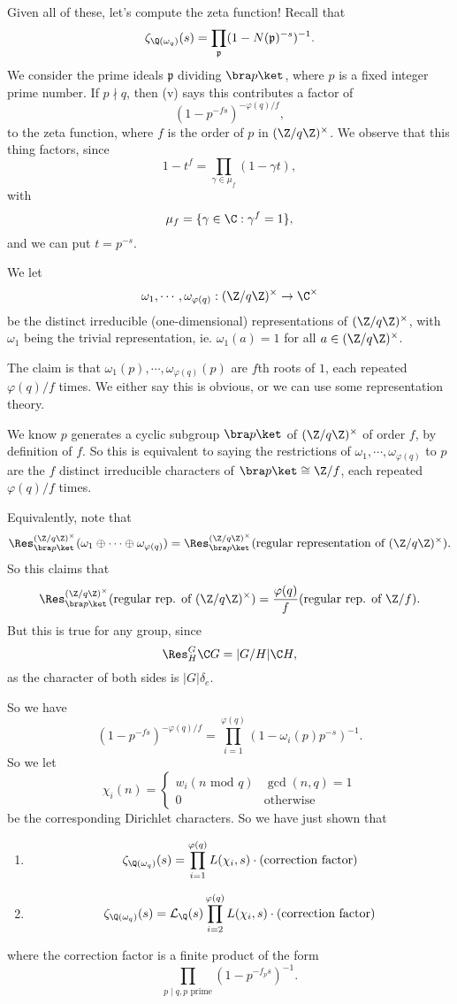\documentclass[a4paper]{article}
\begin{document}
Given all of these, let's compute the zeta function! Recall that
\[
  \zeta_{\Q(\omega_q)}(s) = \prod_{\mathfrak{p}}(1 - N(\mathfrak{p})^{-s})^{-1}.
\]
We consider the prime ideals $\mathfrak{p}$ dividing $\bra p\ket$, where $p$ is a fixed integer prime number. If $p \nmid q$, then (v) says this contributes a factor of
\[
  (1 - p^{-fs})^{-\varphi(q)/f},
\]
to the zeta function, where $f$ is the order of $p$ in $(\Z/q\Z)^\times$. We observe that this thing factors, since
\[
  1 - t^f = \prod_{\gamma \in \mu_f}(1 - \gamma t),
\]
with
\[
  \mu_f = \{\gamma \in \C: \gamma^f = 1\},
\]
and we can put $t = p^{-s}$.

We let
\[
  \omega_1, \cdots, \omega_{\varphi(q)}: (\Z/q\Z)^\times \to \C^\times
\]
be the distinct irreducible (one-dimensional) representations of $(\Z/q\Z)^\times$, with $\omega_1$ being the trivial representation, ie. $\omega_1(a) = 1$ for all $a \in (\Z/q\Z)^\times$.

The claim is that $\omega_1(p), \cdots, \omega_{\varphi(q)}(p)$ are $f$th roots of $1$, each repeated $\varphi(q)/f$ times. We either say this is obvious, or we can use some representation theory.

We know $p$ generates a cyclic subgroup $\bra p\ket$ of $(\Z/q\Z)^\times$ of order $f$, by definition of $f$. So this is equivalent to saying the restrictions of $\omega_1, \cdots, \omega_{\varphi(q)}$ to $p$ are the $f$ distinct irreducible characters of $\bra p\ket \cong \Z/f$, each repeated $\varphi(q)/f$ times.

Equivalently, note that
\[
  \Res^{(\Z/q\Z)^\times}_{\bra p\ket} (\omega_1 \oplus \cdots \oplus \omega_{\varphi(q)}) = \Res_{\bra p\ket}^{(\Z/q\Z)^\times}(\text{regular representation of }(\Z/q\Z)^\times).
\]
So this claims that
\[
  \Res_{\bra p\ket}^{(\Z/q\Z)^\times} (\text{regular rep. of }(\Z/q\Z)^\times) = \frac{\varphi(q)}{f} (\text{regular rep. of }\Z/f).
\]
But this is true for any group, since
\[
  \Res_H^G \C G = |G/H| \C H,
\]
as the character of both sides is $|G| \delta_e$.

So we have
\[
  (1 - p^{-fs})^{-\varphi(q)/f} = \prod_{i = 1}^{\varphi(q)}(1 - \omega_i(p) p^{-s})^{-1}.
\]
So we let
\[
  \chi_i(n) =
  \begin{cases}
    w_i(n\text{ mod }q) & \gcd(n, q) = 1\\
    0 & \text{otherwise}
  \end{cases}
\]
be the corresponding Dirichlet characters. So we have just shown that
\begin{prop}\leavevmode
  \begin{enumerate}
    \item
      \[
        \zeta_{\Q(\omega_q)}(s) = \prod_{i = 1}^{\varphi(q)} L(\chi_i, s) \cdot (\text{correction factor})
      \]
    \item
      \[
        \zeta_{\Q(\omega_q)}(s) = \mathcal{L}_\Q(s) \prod_{i = 2}^{\varphi(q)} L(\chi_i, s) \cdot (\text{correction factor})
      \]
  \end{enumerate}
  where the correction factor is a finite product of the form
  \[
    \prod_{p \mid q, p\text{ prime}} (1 - p^{-f_p s})^{-1}.
  \]
\end{prop}
\end{document}
